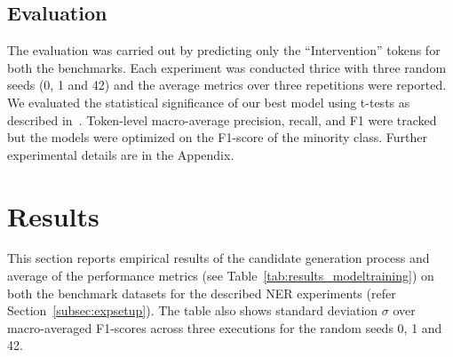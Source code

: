 \documentclass[letterpaper]{article} %
\begin{document}
\subsection{Evaluation}
\label{subsec:eval}
%
The evaluation was carried out by predicting only the ``Intervention'' tokens for both the benchmarks.
Each experiment was conducted thrice with three random seeds (0, 1 and 42) and the average metrics over three repetitions were reported.
We evaluated the statistical significance of our best model using t-tests as described in~\cite{dror2018hitchhiker}.
Token-level macro-average precision, recall, and F1 were tracked but the models were optimized on the F1-score of the minority class.
Further experimental details are in the Appendix.
%
\section{Results}
\label{sec:results}
%
This section reports empirical results of the candidate generation process and average of the performance metrics (see Table~\ref{tab:results_modeltraining}) on both the benchmark datasets for the described NER experiments (refer Section~\ref{subsec:expsetup}).
The table also shows standard deviation $\sigma$ over macro-averaged F1-scores across three executions for the random seeds 0, 1 and 42.
%
\end{document}
